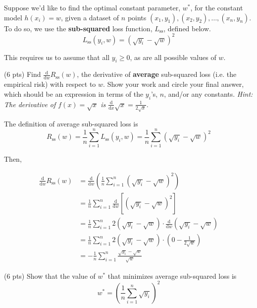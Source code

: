 \documentclass[11pt]{article}
\begin{document}
\newpage

\begin{prob}[(20 pts)]
Suppose we'd like to find the optimal constant parameter, $w^*$, for the constant model $h(x_i) = w$, given a dataset of $n$ points $(x_1, y_1), (x_2, y_2), \ldots, (x_n, y_n)$. To do so, we use the \textbf{sub-squared} loss function, $L_\text{ss}$, defined below.
$$L_\text{ss}(y_i, w) = (\sqrt{y_i} - \sqrt{w})^2$$

This requires us to assume that all $y_i \ge 0$, as are all possible values of $w$.

\begin{subprob}(6 pts) Find $\frac{\text{d}}{\text{d}w} R_\text{ss}(w)$, the derivative of \textbf{average} sub-squared loss (i.e. the empirical risk) with respect to $w$. Show your work and $\boxed{\text{circle}}$ your final answer, which should be an expression in terms of the $y_i$'s, $n$, and/or any constants. \textit{Hint: The derivative of $f(x) = \sqrt{x}$ is $\frac{\text{d}}{\text{d}x} \sqrt{x} = \frac{1}{2\sqrt{x}}$.}

\emptybox{7cm}

\begin{solution}

The definition of average sub-squared loss is
$$R_\text{ss}(w) = \frac{1}{n} \sum_{i=1}^n L_\text{ss}(y_i, w) = \frac{1}{n} \sum_{i=1}^n (\sqrt{y_i} - \sqrt{w})^2$$

Then,

\begin{align*}
  \frac{\text{d}}{\text{d}w} R_\text{ss}(w)
  &= \frac{\text{d}}{\text{d}w} \left( \frac{1}{n} \sum_{i=1}^n (\sqrt{y_i} - \sqrt{w})^2 \right) \\
  &= \frac{1}{n} \sum_{i=1}^n \frac{\text{d}}{\text{d}w} \left[(\sqrt{y_i} - \sqrt{w})^2\right] \\
  &= \frac{1}{n} \sum_{i=1}^n 2(\sqrt{y_i} - \sqrt{w}) \cdot \frac{\text{d}}{\text{d}w} (\sqrt{y_i} - \sqrt{w}) \\
  &= \frac{1}{n} \sum_{i=1}^n 2(\sqrt{y_i} - \sqrt{w}) \cdot \left(0 -\frac{1}{2\sqrt{w}} \right) \\
  &= \boxed{-\frac{1}{n} \sum_{i=1}^n \frac{\sqrt{y_i} - \sqrt{w}}{\sqrt{w}}}
\end{align*}

\end{solution}

\end{subprob}

\begin{subprob}(6 pts) Show that the value of $w^*$ that minimizes average sub-squared loss is 
$$\displaystyle w^* = \left( \frac{1}{n} \sum_{i=1}^n \sqrt{y_i} \right)^2$$


\end{subprob}
\end{prob}
\end{document}
